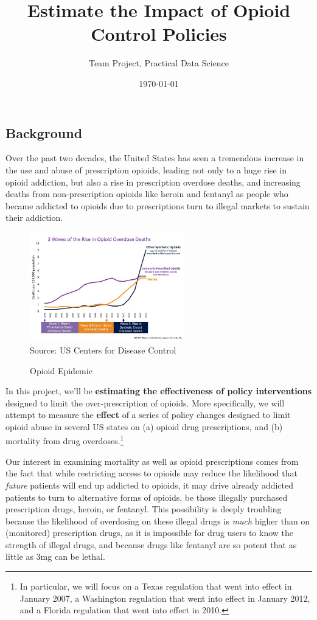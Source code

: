 \documentclass[12pt]{article}
\title{Estimate the Impact of Opioid Control Policies}
\author{Team Project, Practical Data Science}
\date{\today}
\begin{document}
\maketitle

\subsection*{Background}

Over the past two decades, the United States has seen a tremendous increase in the use and abuse of prescription opioids, leading not only to a huge rise in opioid addiction, but also a rise in prescription overdose deaths, and increasing deaths from non-prescription opioids like heroin and fentanyl as people who became addicted to opioids due to prescriptions turn to illegal markets to sustain their addiction.

\begin{figure}[h!]
  \centering
  \caption{Opioid Epidemic}\label{}
  \includegraphics[width=0.6\textwidth]{images/cdc_opioid_stats.png}\\
  \scriptsize{Source: US Centers for Disease Control}
\end{figure}

In this project, we'll be \textbf{estimating the effectiveness of policy interventions} designed to limit the over-prescription of opioids. More specifically, we will attempt to measure the \textbf{effect} of a series of policy changes designed to limit opioid abuse in several US states on (a) opioid drug prescriptions, and (b) mortality from drug overdoses.\footnote{ In particular, we will focus on a Texas regulation that went into effect in January 2007, a Washington regulation that went into effect in January 2012, and a Florida regulation that went into effect in 2010.}

Our interest in examining mortality as well as opioid prescriptions comes from the fact that while restricting access to opioids may reduce the likelihood that \emph{future} patients will end up addicted to opioids, it may drive already addicted patients to turn to alternative forms of opioids, be those illegally purchased prescription drugs, heroin, or fentanyl. This possibility is deeply troubling because the likelihood of overdosing on these illegal drugs is \emph{much} higher than on (monitored) prescription drugs, as it is impossible for drug users to know the strength of illegal drugs, and because drugs like fentanyl are so potent that as little as 3mg can be lethal.
\end{document}

